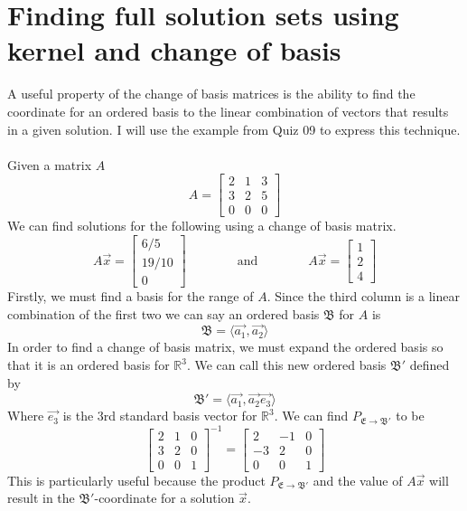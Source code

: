 \documentclass{report}
\begin{document}
\section{Finding full solution sets using kernel and change of basis}
A useful property of the change of basis matrices is the ability to find the coordinate for an ordered basis to the linear combination of vectors that results in a given solution.  I will use the example from Quiz 09 to express this technique. \\
\\
\noindent Given a matrix $A$
$$
A = \begin{bmatrix}
2&1&3\\
3&2&5\\
0&0&0
\end{bmatrix}
$$
We can find solutions for the following using a change of basis matrix.
$$
A\vec{x} = \begin{bmatrix}6/5\\19/10\\0\end{bmatrix}\qquad\qquad\text{and}\qquad\qquad A\vec{x}=\begin{bmatrix}1\\2\\4\end{bmatrix}
$$
Firstly,  we must find a basis for the range of $A$.  Since the third column is a linear combination of the first two we can say an ordered basis $\mathfrak{B}$ for $A$ is
$$
\mathfrak{B} = \langle\vec{a_1},\vec{a_2}\rangle
$$
In order to find a change of basis matrix,  we must expand the ordered basis so that it is an ordered basis for $\mathbb{R}^3$.  We can call this new ordered basis $\mathfrak{B}'$ defined by
$$
\mathfrak{B}' = \langle\vec{a_1},\vec{a_2}\vec{e_3}\rangle
$$
Where $\vec{e_3}$ is the 3rd standard basis vector for $\mathbb{R}^3$.  We can find $P_{\mathfrak{E}\rightarrow\mathfrak{B}'}$ to be
$$
\begin{bmatrix}
2&1&0\\
3&2&0\\
0&0&1
\end{bmatrix}^{-1} = \begin{bmatrix}
2&-1&0\\
-3&2&0\\
0&0&1
\end{bmatrix}
$$
This is particularly useful because the product $P_{\mathfrak{E}\rightarrow\mathfrak{B}'}$ and the value of $A\vec{x}$ will result in the $\mathfrak{B}'$-coordinate for a solution $\vec{x}$. 
\end{document}

